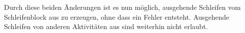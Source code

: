 \documentclass{article}
\begin{document}
    Durch diese beiden Änderungen ist es nun möglich, ausgehende Schleifen vom Schleifenblock aus zu erzeugen, ohne dass ein Fehler entsteht.
    Ausgehende Schleifen von anderen Aktivitäten aus sind weiterhin nicht erlaubt.
\end{document}

